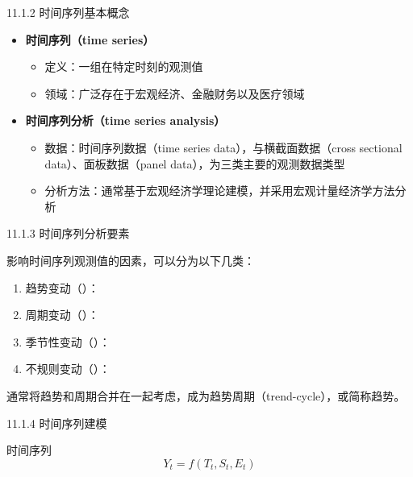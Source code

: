 \documentclass[
  ignorenonframetext,
]{beamer}
\providecommand{\tightlist}{%
  \setlength{\itemsep}{0pt}\setlength{\parskip}{0pt}}
\begin{document}
\begin{frame}{11.1.2 时间序列基本概念}
\protect\hypertarget{ux65f6ux95f4ux5e8fux5217ux57faux672cux6982ux5ff5}{}

\begin{itemize}
\tightlist
\item
  \textbf{时间序列（time series）}

  \begin{itemize}
  \tightlist
  \item
    定义：一组在特定时刻的观测值
  \item
    领域：广泛存在于宏观经济、金融财务以及医疗领域
  \end{itemize}
\item
  \textbf{时间序列分析（time series analysis）}

  \begin{itemize}
  \tightlist
  \item
    数据：时间序列数据（time series data），与横截面数据（cross
    sectional data）、面板数据（panel data），为三类主要的观测数据类型
  \item
    分析方法：通常基于宏观经济学理论建模，并采用宏观计量经济学方法分析
  \end{itemize}
\end{itemize}

\end{frame}

\begin{frame}{11.1.3 时间序列分析要素}
\protect\hypertarget{ux65f6ux95f4ux5e8fux5217ux5206ux6790ux8981ux7d20}{}

影响时间序列观测值的因素，可以分为以下几类：

\begin{enumerate}
\tightlist
\item
  趋势变动（）：
\item
  周期变动（）：
\item
  季节性变动（）：
\item
  不规则变动（）：
\end{enumerate}

通常将趋势和周期合并在一起考虑，成为趋势周期（trend-cycle），或简称趋势。

\end{frame}

\begin{frame}{11.1.4 时间序列建模}
\protect\hypertarget{ux65f6ux95f4ux5e8fux5217ux5efaux6a21}{}

时间序列 \[
Y_{t} = f(T_{t}, S_{t}, E_{t})
\]

\end{frame}
\end{document}
